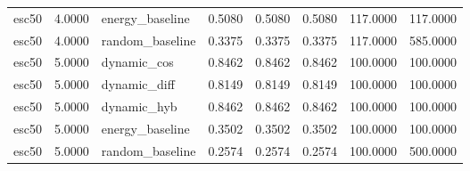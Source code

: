 \begin{table}[htbp]
\begin{tabular}{llllllll}
esc50 & 4.0000 & energy\_baseline & 0.5080 & 0.5080 & 0.5080 & 117.0000 & 117.0000 \\
esc50 & 4.0000 & random\_baseline & 0.3375 & 0.3375 & 0.3375 & 117.0000 & 585.0000 \\
esc50 & 5.0000 & dynamic\_cos & 0.8462 & 0.8462 & 0.8462 & 100.0000 & 100.0000 \\
esc50 & 5.0000 & dynamic\_diff & 0.8149 & 0.8149 & 0.8149 & 100.0000 & 100.0000 \\
esc50 & 5.0000 & dynamic\_hyb & 0.8462 & 0.8462 & 0.8462 & 100.0000 & 100.0000 \\
esc50 & 5.0000 & energy\_baseline & 0.3502 & 0.3502 & 0.3502 & 100.0000 & 100.0000 \\
esc50 & 5.0000 & random\_baseline & 0.2574 & 0.2574 & 0.2574 & 100.0000 & 500.0000 \\
\bottomrule
\end{tabular}
\end{table}

